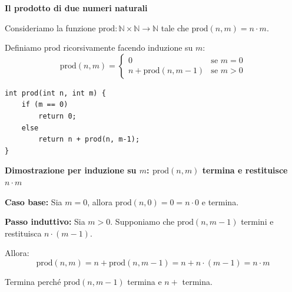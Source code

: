 \medskip



















\begin{esempio}
\textbf{Il prodotto di due numeri naturali}

Consideriamo la funzione $\text{prod} : \mathbb{N} \times \mathbb{N} \to \mathbb{N}$ tale che $\text{prod}(n,m) = n \cdot m$.

Definiamo $\text{prod}$ ricorsivamente facendo induzione su $m$:
\[
\text{prod}(n,m) = 
\begin{cases}
0 & \text{se } m = 0 \\
n + \text{prod}(n,m-1) & \text{se } m > 0
\end{cases}
\]
\begin{tcolorbox}[
    colback=backcolour, 
    colframe=framegray, 
    boxrule=0.5pt, 
    sharp corners,
    left=5mm, right=5mm, 
    top=5mm, bottom=5mm,
    width=\linewidth
]
\begin{lstlisting}[commentstyle=\color{codegray}]
int prod(int n, int m) {
    if (m == 0)
        return 0;
    else
        return n + prod(n, m-1);
}

\end{lstlisting}
\end{tcolorbox}


\textbf{Dimostrazione per induzione su $m$: $\text{prod}(n,m)$ termina e restituisce $n \cdot m$}

\textbf{Caso base:} Sia $m=0$, allora $\text{prod}(n,0)=0=n \cdot 0$ e termina.

\textbf{Passo induttivo:} Sia $m>0$. Supponiamo che $\text{prod}(n,m-1)$ termini e restituisca $n \cdot (m-1)$.

Allora:
\[
\text{prod}(n,m) = n + \text{prod}(n,m-1) = n + n \cdot (m-1) = n \cdot m
\]

Termina perché $\text{prod}(n,m-1)$ termina e $n+$ termina.


\end{esempio}

